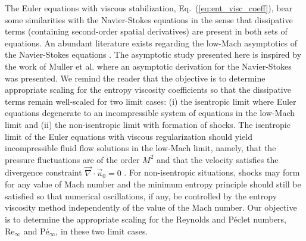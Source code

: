 \documentclass[preprint,10pt]{elsarticle}
\renewcommand{\div}{\vec{\nabla}\! \cdot \!}
\renewcommand{\Re}{\textrm{Re}}
\newcommand{\Pe}{\textrm{P\'e}}
\newcommand{\eqt}[1]{Eq.~(\ref{#1})}                     %
\begin{document}
The Euler equations with viscous stabilization, \eqt{eq:ent_visc_coeff}, bear some similarities with the Navier-Stokes equations in the sense that dissipative terms (containing second-order spatial derivatives) are present in both sets of equations. An abundant literature exists regarding the low-Mach asymptotics of the Navier-Stokes equations \cite{LowMach1, LowMach2, LowMach3, Muller}.   
%
The asymptotic study presented here is inspired by the work of Muller et al. \cite{Muller} where an asymptotic derivation for the Navier-Stokes was presented. 
We remind the reader that the objective is to determine appropriate scaling for the entropy viscosity coefficients so that the dissipative terms remain well-scaled for two limit cases: 
(i) the isentropic limit where Euler equations degenerate to an incompressible system of equations in the low-Mach limit and 
(ii) the non-isentropic limit with formation of shocks. 
The isentropic limit of the Euler equations with viscous regularization should yield incompressible fluid flow solutions in the low-Mach limit, namely, that the pressure fluctuations are of the order $M^2$ and that the velocity satisfies the divergence constraint $\div \vec{u}_0 = 0$ \cite{LowMach1, LowMach2, LowMach3}. For non-isentropic situations, shocks may form for any value of Mach number and the minimum entropy principle should still be satisfied so that numerical oscillations, if any, be controlled by the entropy viscosity method independently of the value of the Mach number.
Our objective is to determine the appropriate scaling for the Reynolds and P\'eclet numbers, $\Re_\infty$ and $\Pe_\infty$, in these two limit cases.
\end{document}
